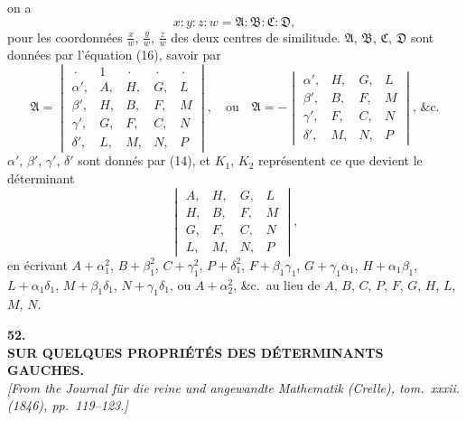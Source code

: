 \documentclass[11pt]{article}
\begin{document}
on a
\[
x : y : z : w = \mathfrak{A} : \mathfrak{B} : \mathfrak{C} : \mathfrak{D} \tag{17},
\]
pour les coordonn\'ees $\tfrac{x}{w}$, $\tfrac{y}{w}$, $\tfrac{z}{w}$ des deux centres de similitude. $\mathfrak{A}$, $\mathfrak{B}$, $\mathfrak{C}$, $\mathfrak{D}$ sont
donn\'ees par l'\'equation (16), savoir par
\[
\mathfrak{A} = \begin{vmatrix} \,\cdot\, & 1 & \,\cdot\, & \,\cdot\, & \,\cdot\, \\ \alpha', & A, & H, & G, & L \\ \beta', & H, & B, & F, & M \\ \gamma', & G, & F, & C, & N \\ \delta', & L, & M, & N, & P \end{vmatrix}, \quad
\text{ou}\quad \mathfrak{A} = -\begin{vmatrix} \alpha', & H, & G, & L \\ \beta', & B, & F, & M \\ \gamma', & F, & C, & N \\ \delta', & M, & N, & P \end{vmatrix}, \,\&\text{c.} \tag{18}
\]
$\alpha'$, $\beta'$, $\gamma'$, $\delta'$ sont donn\'es par (14), et $K_{1}$, $K_{2}$ repr\'esentent ce que devient le d\'eterminant
\[
\begin{vmatrix} A, & H, & G, & L \\ H, & B, & F, & M \\ G, & F, & C, & N \\ L, & M, & N, & P \end{vmatrix} \tag{19},
\]
en \'ecrivant $A + \alpha_{1}^{2}$, $B + \beta_{1}^{2}$, $C + \gamma_{1}^{2}$, $P + \delta_{1}^{2}$, $F + \beta_{1}\gamma_{1}$, $G + \gamma_{1}\alpha_{1}$, $H + \alpha_{1}\beta_{1}$, $L + \alpha_{1}\delta_{1}$, $M + \beta_{1}\delta_{1}$,
$N + \gamma_{1}\delta_{1}$, ou $A + \alpha_{2}^{2}$, \&c.\ au lieu de $A$, $B$, $C$, $P$, $F$, $G$, $H$, $L$, $M$, $N$.

\bigskip

\begin{center}
\textbf{\large 52.}\\[0.7em]
\textbf{\large SUR QUELQUES PROPRI\'ET\'ES DES D\'ETERMINANTS GAUCHES.}\\[0.5em]
\textit{[From the Journal f\"ur die reine und angewandte Mathematik (Crelle), tom.~xxxii.\\
(1846), pp.~119--123.]}
\end{center}
\end{document}
